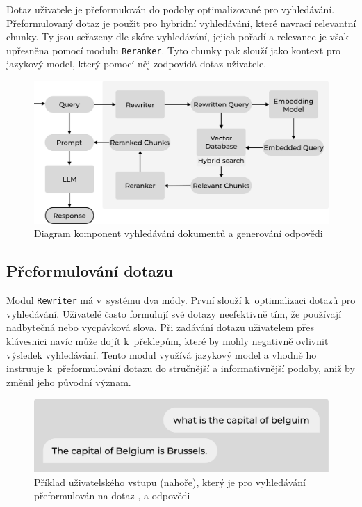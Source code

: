 Dotaz uživatele je přeformulován do podoby optimalizované pro vyhledávání. Přeformulovaný dotaz je použit pro hybridní vyhledávání, které navrací relevantní chunky. Ty jsou seřazeny dle skóre vyhledávání, jejich pořadí a relevance je však upřesněna pomocí modulu \texttt{Reranker}. Tyto chunky pak slouží jako kontext pro jazykový model, který pomocí něj zodpovídá dotaz uživatele.

\begin{figure}[H]
    \centering
    \includegraphics[width=1\linewidth]{obrazky/retrieval.pdf}
    \caption{Diagram komponent vyhledávání dokumentů a generování odpovědi}
    \label{fig:retrieval}
\end{figure}

\subsection{Přeformulování dotazu}
Modul \texttt{Rewriter} má v~systému dva módy. První slouží k~optimalizaci dotazů pro vyhledávání. Uživatelé často formulují své dotazy neefektivně tím, že používají nadbytečná nebo vycpávková slova. Při zadávání dotazu uživatelem přes klávesnici navíc může dojít k~překlepům, které by mohly negativně ovlivnit výsledek vyhledávání. Tento modul využívá jazykový model a vhodně ho instruuje k~přeformulování dotazu do stručnější a informativnější podoby, aniž by změnil jeho původní význam.

\begin{figure}[H]
    \centering
    \includegraphics[width=0.7\linewidth]{obrazky/rewriting.pdf}
    \caption{Příklad uživatelského vstupu (nahoře), který je pro vyhledávání přeformulován na dotaz , a odpovědi}
    \label{fig:rewriting}
\end{figure}

